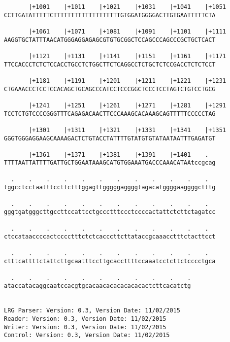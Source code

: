 \documentclass{article}
\begin{document}
\begin{Verbatim}
       |+1001    |+1011    |+1021    |+1031    |+1041    |+1051
CCTTGATATTTTTCTTTTTTTTTTTTTTTTTTTGTGGATGGGGACTTGTGAATTTTTCTA
                                                            
       |+1061    |+1071    |+1081    |+1091    |+1101    |+1111
AAGGTGCTATTTAACATGGGAGGAGAGCGTGTGCGGCTCCAGCCCAGCCCGCTGCTCACT
                                                            
       |+1121    |+1131    |+1141    |+1151    |+1161    |+1171
TTCCACCCTCTCTCCACCTGCCTCTGGCTTCTCAGGCCTCTGCTCTCCGACCTCTCTCCT
                                                            
       |+1181    |+1191    |+1201    |+1211    |+1221    |+1231
CTGAAACCCTCCTCCACAGCTGCAGCCCATCCTCCCGGCTCCCTCCTAGTCTGTCCTGCG
                                                            
       |+1241    |+1251    |+1261    |+1271    |+1281    |+1291
TCCTCTGTCCCCGGGTTTCAGAGACAACTTCCCAAAGCACAAAGCAGTTTTTCCCCCTAG
                                                            
       |+1301    |+1311    |+1321    |+1331    |+1341    |+1351
GGGTGGGAGGAAGCAAAAGACTCTGTACCTATTTTGTATGTGTATAATAATTTGAGATGT
                                                            
       |+1361    |+1371    |+1381    |+1391    |+1401    .  
TTTTAATTATTTTGATTGCTGGAATAAAGCATGTGGAAATGACCCAAACATAAtccgcag
                                                            
  .    .    .    .    .    .    .    .    .    .    .    .  
tggcctcctaatttccttctttggagttgggggaggggtagacatggggaaggggctttg
                                                            
  .    .    .    .    .    .    .    .    .    .    .    .  
gggtgatgggcttgccttccattcctgccctttccctccccactattctcttctagatcc
                                                            
  .    .    .    .    .    .    .    .    .    .    .    .  
ctccataaccccactcccctttctctcacccttcttataccgcaaacctttctacttcct
                                                            
  .    .    .    .    .    .    .    .    .    .    .    .  
ctttcattttctattcttgcaatttccttgcaccttttccaaatcctcttctcccctgca
                                                            
  .    .    .    .    .    .    .    .    .    .    .
ataccatacaggcaatccacgtgcacaacacacacacacactcttcacatctg
                                                     
                                                     
LRG Parser: Version: 0.3, Version Date: 11/02/2015
Reader: Version: 0.3, Version Date: 11/02/2015
Writer: Version: 0.3, Version Date: 11/02/2015
Control: Version: 0.3, Version Date: 11/02/2015
\end{Verbatim}
\end{document}
